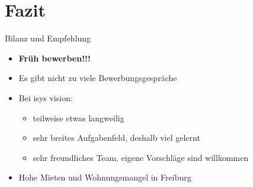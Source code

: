 \documentclass[xcolor=dvipsnames]{beamer}
\begin{document}
\section{Fazit}

\begin{frame}{Bilanz und Empfehlung}
\begin{itemize}
\item \textbf{Früh bewerben!!!}
\item Es gibt nicht zu viele Bewerbungsgespräche
\item Bei isys vision:
\begin{itemize}
\item teilweise etwas langweilig
\item sehr breites Aufgabenfeld, deshalb viel gelernt
\item sehr freundliches Team, eigene Vorschläge sind willkommen
\end{itemize}
\item Hohe Mieten und Wohnungsmangel in Freiburg
\end{itemize}
\end{frame}


\end{document}
